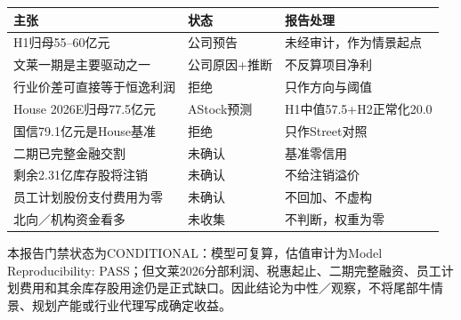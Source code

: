 \begin{exhibitbox}[高影响主张的最终状态]
\scriptsize
\noindent\begin{tabularx}{\textwidth}{L{4.0cm}L{2.25cm}X}
\toprule
\textbf{主张} & \textbf{状态} & \textbf{报告处理} \\
\midrule
H1归母55--60亿元 & 公司预告 & 未经审计，作为情景起点 \\
文莱一期是主要驱动之一 & 公司原因+推断 & 不反算项目净利 \\
行业价差可直接等于恒逸利润 & 拒绝 & 只作方向与阈值 \\
House 2026E归母77.5亿元 & AStock预测 & H1中值57.5+H2正常化20.0 \\
国信79.1亿元是House基准 & 拒绝 & 只作Street对照 \\
二期已完整金融交割 & 未确认 & 基准零信用 \\
剩余2.31亿库存股将注销 & 未确认 & 不给注销溢价 \\
员工计划股份支付费用为零 & 未确认 & 不回加、不虚构 \\
北向／机构资金看多 & 未收集 & 不判断，权重为零 \\
\bottomrule
\end{tabularx}
\end{exhibitbox}

本报告门禁状态为CONDITIONAL：模型可复算，估值审计为Model Reproducibility: PASS；但文莱2026分部利润、税惠起止、二期完整融资、员工计划费用和其余库存股用途仍是正式缺口。因此结论为中性／观察，不将尾部牛情景、规划产能或行业代理写成确定收益。
